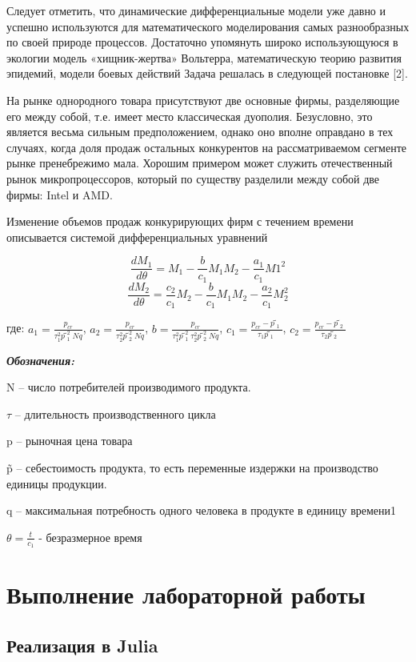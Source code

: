 \documentclass[
  12pt,
  a4paper,
  DIV=11,
  numbers=noendperiod]{scrreprt}
\begin{document}
Следует отметить, что динамические дифференциальные модели уже давно и
успешно используются для математического моделирования самых
разнообразных по своей природе процессов. Достаточно упомянуть широко
использующуюся в экологии модель «хищник-жертва» Вольтерра,
математическую теорию развития эпидемий, модели боевых действий Задача
решалась в следующей постановке {[}2{]}.

На рынке однородного товара присутствуют две основные фирмы, разделяющие
его между собой, т.е. имеет место классическая дуополия. Безусловно, это
является весьма сильным предположением, однако оно вполне оправдано в
тех случаях, когда доля продаж остальных конкурентов на рассматриваемом
сегменте рынке пренебрежимо мала. Хорошим примером может служить
отечественный рынок микропроцессоров, который по существу разделили
между собой две фирмы: Intel и AMD.

Изменение объемов продаж конкурирующих фирм с течением времени
описывается системой дифференциальных уравнений

\[
\frac{dM_1}{d\theta} = M_1 - \frac{b}{c_1}M_1M_2 - \frac{a_1}{c_1}M1^2
\] \[
\frac{dM_2}{d\theta} = \frac{c_2}{c_1}M_2 - \frac{b}{c_1}M_1M_2 - \frac{a_2}{c_1}M_2^2
\]

где: \(a_1 = \frac{p_{cr}}{\tau_1^2p̃_1^2Nq}\),
\(a_2 = \frac{p_{cr}}{\tau_2^2p̃_2^2Nq}\),
\(b = \frac{p_{cr}}{\tau_1^2p̃_1^2\tau_2^2p̃_2^2Nq}\),
\(c_1 = \frac{p_{cr} - p̃_1}{\tau_1p̃_1}\),
\(c_2 = \frac{p_{cr} - p̃_2}{\tau_2p̃_2}\)

\textbf{\emph{Обозначения:}}

N -- число потребителей производимого продукта.

\(\tau\) -- длительность производственного цикла

p -- рыночная цена товара

p̃ -- себестоимость продукта, то есть переменные издержки на производство
единицы продукции.

q -- максимальная потребность одного человека в продукте в единицу
времени1

\(\theta = \frac{t}{c_1}\) - безразмерное время

\chapter{Выполнение лабораторной
работы}\label{ux432ux44bux43fux43eux43bux43dux435ux43dux438ux435-ux43bux430ux431ux43eux440ux430ux442ux43eux440ux43dux43eux439-ux440ux430ux431ux43eux442ux44b}

\section{Реализация в
Julia}\label{ux440ux435ux430ux43bux438ux437ux430ux446ux438ux44f-ux432-julia}
\end{document}
